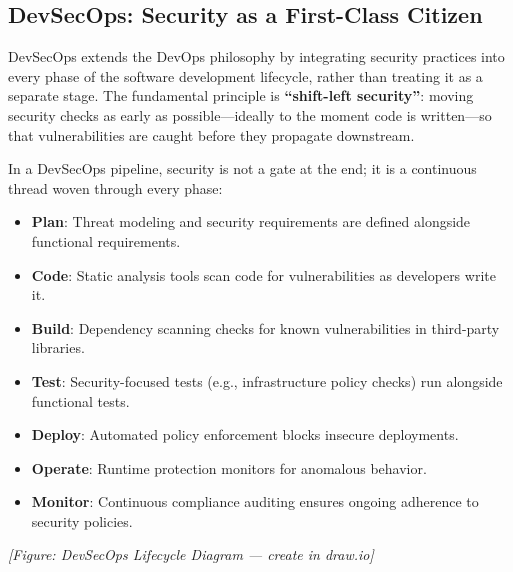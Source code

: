 \subsection{DevSecOps: Security as a First-Class Citizen}

DevSecOps extends the DevOps philosophy by integrating security practices into every phase of the software development lifecycle, rather than treating it as a separate stage. The fundamental principle is \textbf{``shift-left security''}: moving security checks as early as possible—ideally to the moment code is written—so that vulnerabilities are caught before they propagate downstream.

In a DevSecOps pipeline, security is not a gate at the end; it is a continuous thread woven through every phase:

\begin{itemize}
    \item \textbf{Plan}: Threat modeling and security requirements are defined alongside functional requirements.
    \item \textbf{Code}: Static analysis tools scan code for vulnerabilities as developers write it.
    \item \textbf{Build}: Dependency scanning checks for known vulnerabilities in third-party libraries.
    \item \textbf{Test}: Security-focused tests (e.g., infrastructure policy checks) run alongside functional tests.
    \item \textbf{Deploy}: Automated policy enforcement blocks insecure deployments.
    \item \textbf{Operate}: Runtime protection monitors for anomalous behavior.
    \item \textbf{Monitor}: Continuous compliance auditing ensures ongoing adherence to security policies.
\end{itemize}


\textit{[Figure: DevSecOps Lifecycle Diagram — create in draw.io]}

